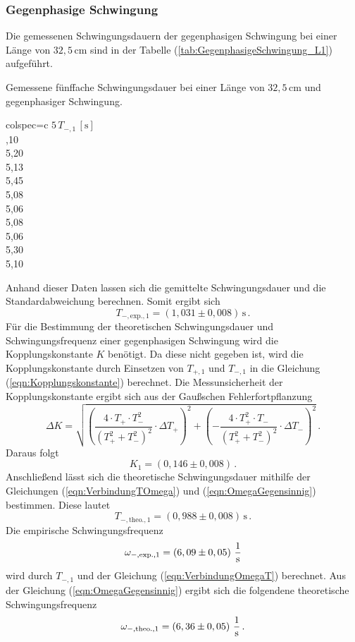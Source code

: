 \subsubsection{Gegenphasige Schwingung}
\label{sec:GegenphasigeSchwingung_KurzelPendel}
Die gemessenen Schwingungsdauern der gegenphasigen Schwingung bei einer Länge von $32,5\, \unit{\centi\meter}$ sind 
in der Tabelle (\ref{tab:GegenphasigeSchwingung_L1}) aufgeführt. 
\begin{table}[H]
  \centering
  \caption{Gemessene fünffache Schwingungsdauer bei einer Länge von $32,5\, \unit{\centi\meter}$ und gegenphasiger Schwingung.}
  \label{tab:GegenphasigeSchwingung_L1}
  \begin{tblr}{colspec={c}}
      \toprule
      $5\, T_{-, 1}\,\left[\unit{\second}\right]$\\
      ,10 \\
      5,20 \\
      5,13 \\
      5,45 \\
      5,08 \\
      5,06 \\
      5,08 \\
      5,06 \\
      5,30 \\
      5,10 \\
      \bottomrule
  \end{tblr}
\end{table}
Anhand dieser Daten lassen sich die gemittelte Schwingungsdauer und die Standardabweichung berechnen. Somit ergibt sich
$$T_{-,\text{exp.}, 1} = \left(1,031 \pm 0,008 \right)\, \unit{\second}\,.$$ 
Für die Bestimmung der theoretischen Schwingungsdauer und Schwingungsfrequenz einer gegenphasigen Schwingung wird die Kopplungskonstante $K$ benötigt. Da
diese nicht gegeben ist, wird die Kopplungskonstante durch Einsetzen von $T_{+,1}$ und $T_{-,1}$ in die Gleichung (\ref{eqn:Kopplungskonstante}) berechnet. Die Messunsicherheit der Kopplungskonstante
ergibt sich aus der Gaußschen Fehlerfortpflanzung
$$\Delta K = \sqrt{\left(\frac{4 \cdot T_+\cdot T_{-}^{2}}{\left(T_{+}^{2} + T_{-}^{2}\right)^{2}}\cdot \Delta T_+\right)^{2}+ \left(-\frac{4\cdot T_{+}^{2}\cdot T_{-}}{\left(T_{+}^{2} + T_{-}^{2}\right)^{2}} \cdot \Delta T_{-}\right)^2}\,.$$
Daraus folgt
$$K_1 = \left( 0,146 \pm 0,008 \right)\,.$$
Anschließend lässt sich die theoretische Schwingungsdauer mithilfe der Gleichungen (\ref{eqn:VerbindungTOmega}) und (\ref{eqn:OmegaGegensinnig}) bestimmen. Diese lautet
$$T_{-,\text{theo.},1} = \left( 0,988 \pm 0,008 \right)\, \unit{\second}\,.$$
Die empirische Schwingungsfrequenz 
$$\omega_{-,\text{exp.},1} = \left( 6,09 \pm 0,05 \right)\, \unit[per-mode=fraction]{\per \second}$$ wird durch $T_{-,1}$ und der Gleichung (\ref{eqn:VerbindungOmegaT})
berechnet. Aus der Gleichung (\ref{eqn:OmegaGegensinnig}) ergibt sich die folgendene theoretische Schwingungsfrequenz
$$\omega_{-,\text{theo.},1} = \left( 6,36 \pm 0,05 \right)\,\unit[per-mode=fraction]{\per \second}\,.$$
%
%
